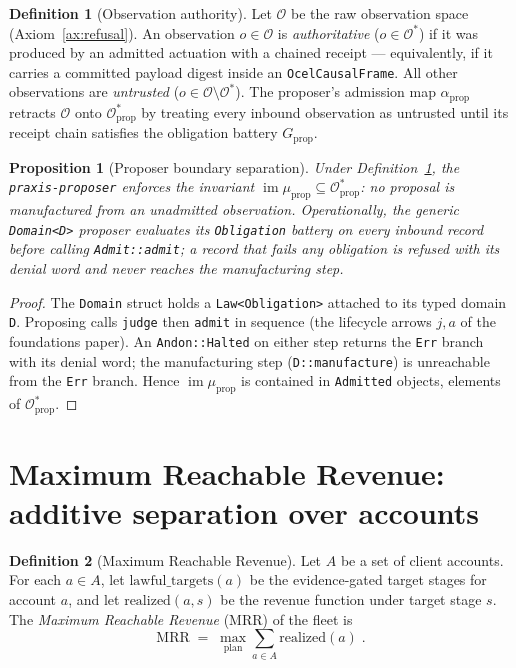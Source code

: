 \documentclass[11pt,oneside]{book}
\theoremstyle{definition}
\newtheorem{definition}{Definition}[chapter]
\theoremstyle{plain}
\newtheorem{proposition}[theorem]{Proposition}
\theoremstyle{remark}
\newcommand{\Obs}{\mathcal{O}}                 %
\newcommand{\Adm}{\mathcal{O}^{*}}             %
\newcommand{\muop}{\mu}                        %
\newcommand{\adm}{\alpha}                      %
\DeclareMathOperator{\im}{im}
\newcommand{\code}[1]{\texttt{#1}}
\begin{document}
\begin{definition}[Observation authority]\label{def:obsauth}
Let $\Obs$ be the raw observation space (Axiom~\ref{ax:refusal}). %
An observation $o\in\Obs$ is \emph{authoritative} ($o\in\Obs^{*}$) if it was produced by an admitted actuation with a chained receipt --- equivalently, if it carries a committed payload digest inside an \code{OcelCausalFrame}. %
All other observations are \emph{untrusted} ($o\in\Obs\setminus\Obs^{*}$). %
The proposer's admission map $\adm_{\mathrm{prop}}$ retracts $\Obs$ onto $\Adm_{\mathrm{prop}}$ by treating every inbound observation as untrusted until its receipt chain satisfies the obligation battery $G_{\mathrm{prop}}$. %
\end{definition}

\begin{proposition}[Proposer boundary separation]\label{prop:boundary}
Under Definition~\ref{def:obsauth}, the \code{praxis-proposer} enforces the invariant $\im\muop_{\mathrm{prop}} \subseteq \Adm_{\mathrm{prop}}$: no proposal is manufactured from an unadmitted observation. %
Operationally, the generic \code{Domain<D>} proposer evaluates its \code{Obligation} battery on every inbound record before calling \code{Admit::admit}; a record that fails any obligation is refused with its denial word and never reaches the manufacturing step. %
\end{proposition}

\begin{proof}
The \code{Domain} struct holds a \code{Law<Obligation>} attached to its typed domain \code{D}. %
Proposing calls \code{judge} then \code{admit} in sequence (the lifecycle arrows $j,a$ of the foundations paper). %
An \code{Andon::Halted} on either step returns the \code{Err} branch with its denial word; the manufacturing step (\code{D::manufacture}) is unreachable from the \code{Err} branch. %
Hence $\im\muop_{\mathrm{prop}}$ is contained in \code{Admitted} objects, elements of $\Adm_{\mathrm{prop}}$. %
\end{proof}

\section{Maximum Reachable Revenue: additive separation over accounts}

\begin{definition}[Maximum Reachable Revenue]\label{def:mrr}
Let $A$ be a set of client accounts. %
For each $a\in A$, let $\mathrm{lawful\_targets}(a)$ be the evidence-gated target stages for account $a$, and let $\mathrm{realized}(a, s)$ be the revenue function under target stage $s$. %
The \emph{Maximum Reachable Revenue} (MRR) of the fleet is %
\[
\mathrm{MRR}\;=\;\max_{\text{plan}}\sum_{a\in A}\mathrm{realized}(a)\;.
\] %
\end{definition}
\end{document}
